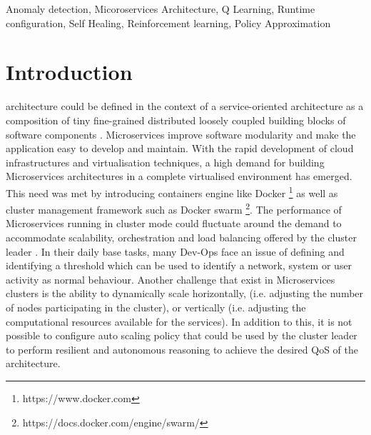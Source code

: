 \documentclass{ieeeaccess}
\begin{document}
\begin{keywords}
Anomaly detection, Micoroservices Architecture, Q Learning, Runtime configuration, Self Healing, Reinforcement learning, Policy Approximation 
\end{keywords}

\titlepgskip=-15pt

\maketitle

\section{Introduction}
\label{sec:introduction}
 architecture could be defined in the context of a service-oriented architecture as a composition of tiny fine-grained distributed loosely coupled building blocks of software components \cite{stubbs2015distributed}. Microservices improve software modularity and make the application easy to develop and maintain. With the rapid development of cloud infrastructures and virtualisation techniques, a high demand for building Microservices architectures in a complete virtualised environment has emerged. This need was met by introducing containers engine like Docker \footnote{https://www.docker.com} as well as cluster management framework such as Docker swarm \footnote{https://docs.docker.com/engine/swarm/}.  
The performance of Microservices running in cluster mode could fluctuate around the demand to accommodate scalability, orchestration and load balancing offered by the cluster leader \cite{stubbs2015distributed}. In their daily base tasks,  many Dev-Ops face an issue of defining and identifying a threshold which can be used to identify a network, system or user activity as normal behaviour. Another challenge that exist in Microservices clusters is the ability to dynamically scale horizontally, (i.e. adjusting the number of nodes participating in the cluster), or vertically (i.e. adjusting the computational resources available for the services). In addition to this, it is not possible to configure auto scaling policy that could be used by the cluster leader to perform resilient and autonomous reasoning to achieve the desired QoS of the architecture. 
\end{document}
